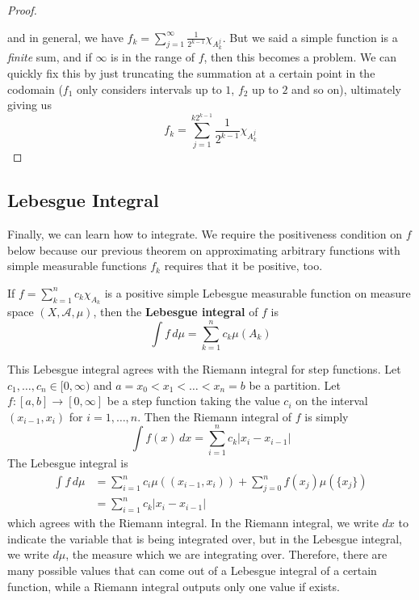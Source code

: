 \documentclass{article}
\begin{document}
\begin{proof}
\begin{center}
  \end{center}
  and in general, we have $f_k = \sum_{j=1}^\infty \frac{1}{2^{k-1}} \chi_{A^j_k}$. But we said a simple function is a \textit{finite} sum, and if $\infty$ is in the range of $f$, then this becomes a problem. We can quickly fix this by just truncating the summation at a certain point in the codomain ($f_1$ only considers intervals up to $1$, $f_2$ up to $2$ and so on), ultimately giving us 
  \[f_k = \sum_{j=1}^{k 2^{k-1}} \frac{1}{2^{k-1}} \chi_{A^j_k} \]
\end{proof}

\subsection{Lebesgue Integral}

Finally, we can learn how to integrate. We require the positiveness condition on $f$ below because our previous theorem on approximating arbitrary functions with simple measurable functions $f_k$ requires that it be positive, too. 

\begin{definition}
  If $f = \sum_{k=1}^n c_k \chi_{A_k}$ is a positive simple Lebesgue measurable function on measure space $(X, \mathcal{A}, \mu)$, then the \textbf{Lebesgue integral} of $f$ is 
  \[\int f \, d\mu = \sum_{k=1}^n c_k \mu(A_k)\]
\end{definition}

This Lebesgue integral agrees with the Riemann integral for step functions. Let $c_1, \ldots, c_n \in [0, \infty)$ and $a = x_0 < x_1 < \ldots < x_n = b$ be a partition. Let $f: [a, b] \longrightarrow [0, \infty]$ be a step function taking the value $c_i$ on the interval $(x_{i-1}, x_i)$ for $i = 1, \ldots, n$. Then the Riemann integral of $f$ is simply 
\[\int f(x) \,dx = \sum_{i=1}^n c_k |x_i - x_{i-1}|\]
The Lebesgue integral is 
\begin{align*}
  \int f \, d \mu & = \sum_{i=1}^n c_i \mu((x_{i-1}, x_i)) + \sum_{j=0}^n f(x_j) \mu(\{x_j\}) \\
  & = \sum_{i=1}^n c_k |x_i - x_{i-1}|
\end{align*}
which agrees with the Riemann integral. In the Riemann integral, we write $dx$ to indicate the variable that is being integrated over, but in the Lebesgue integral, we write $d \mu$, the measure which we are integrating over. Therefore, there are many possible values that can come out of a Lebesgue integral of a certain function, while a Riemann integral outputs only one value if exists. 
\end{document}
